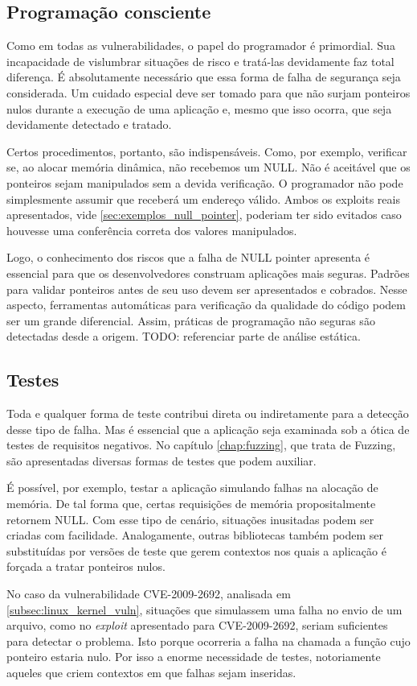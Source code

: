 		\subsection{Programação consciente}
			Como em todas as vulnerabilidades, o papel do programador é primordial.
			Sua incapacidade de vislumbrar situações de risco e tratá-las devidamente faz total diferença.
			É absolutamente necessário que essa forma de falha de segurança seja considerada.
			Um cuidado especial deve ser tomado para que não surjam ponteiros nulos
			durante a execução de uma aplicação e, mesmo que isso ocorra, que seja devidamente
			detectado e tratado.


			Certos procedimentos, portanto, são indispensáveis. Como, por exemplo, verificar se,
			ao alocar memória dinâmica, não recebemos um NULL. Não é aceitável que
			os ponteiros sejam manipulados sem a devida verificação. O programador não pode simplesmente
			assumir que receberá um endereço válido. Ambos os exploits reais apresentados, vide
			\ref{sec:exemplos_null_pointer}, poderiam ter sido evitados caso houvesse uma conferência correta
			dos valores manipulados.

			
			Logo, o conhecimento dos riscos que a falha de NULL pointer apresenta é essencial
			para que os desenvolvedores construam aplicações mais seguras.
			Padrões para validar ponteiros antes de seu uso devem ser apresentados e cobrados.
			Nesse aspecto, ferramentas automáticas para verificação da qualidade do código podem
			ser um grande diferencial. Assim, práticas de programação não seguras são
			detectadas desde a origem. TODO: referenciar parte de análise estática.

		\subsection{Testes}
			Toda e qualquer forma de teste contribui direta ou indiretamente para a detecção
			desse tipo de falha. Mas é essencial que a aplicação seja examinada sob
			a ótica de testes de requisitos negativos.
			No capítulo \ref{chap:fuzzing}, que trata de Fuzzing, são apresentadas
			diversas formas de testes que podem auxiliar.

			
			É possível, por exemplo, testar a aplicação simulando falhas na alocação de memória.
			De tal forma que, certas requisições de memória propositalmente retornem NULL.
			Com esse tipo de cenário, situações inusitadas podem ser criadas com facilidade.
			Analogamente, outras bibliotecas também podem ser substituídas por versões
			de teste que gerem contextos nos quais a aplicação é forçada a tratar ponteiros nulos.			


			No caso da vulnerabilidade CVE-2009-2692, analisada em \ref{subsec:linux_kernel_vuln},
			situações que simulassem uma falha no envio de um arquivo, como no 
			\textsl{exploit} apresentado para CVE-2009-2692, seriam suficientes para detectar o problema. 
			Isto porque ocorreria a falha na chamada a função cujo ponteiro estaria nulo.
			Por isso a enorme necessidade de testes, notoriamente aqueles que criem
			contextos em que falhas sejam inseridas.


